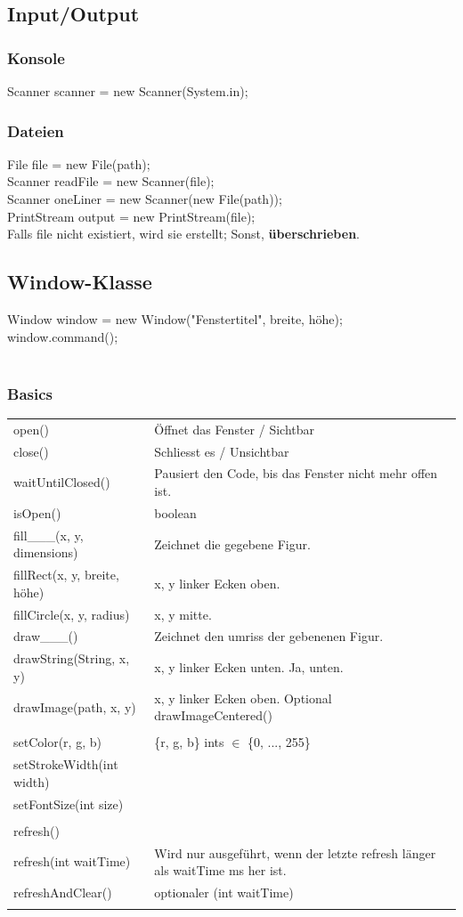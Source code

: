\documentclass[12pt,a4paper]{article}
\begin{document}
\subsection{Input/Output}
\subsubsection{Konsole}
Scanner scanner = new Scanner(System.in);
\subsubsection{Dateien}
File file = new File(path);\\
Scanner readFile = new Scanner(file);\\
Scanner oneLiner = new Scanner(new File(path));\\
PrintStream output = new PrintStream(file);\\
\hspace*{1cm} Falls file nicht existiert, wird sie erstellt; Sonst, \textbf{überschrieben}.
\newpage
\subsection{Window-Klasse}
Window window = new Window("Fenstertitel", breite, höhe);\\
window.command();\\\\
\subsubsection*{Basics}
\begin{tabularx}{\linewidth}{l X}
open() & Öffnet das Fenster / Sichtbar\\
close() & Schliesst es / Unsichtbar\\
waitUntilClosed() & Pausiert den Code, bis das Fenster nicht mehr offen ist.\\
isOpen() & boolean\\
fill\_\_\_(x, y, dimensions) & Zeichnet die gegebene Figur.\\
fillRect(x, y, breite, höhe) & x, y linker Ecken oben.\\
fillCircle(x, y, radius) & x, y mitte.\\
draw\_\_\_() & Zeichnet den umriss der gebenenen Figur.\\
drawString(String, x, y) & x, y linker Ecken unten. Ja, unten.\\
drawImage(path, x, y) & x, y linker Ecken oben. Optional drawImageCentered()\\\\
setColor(r, g, b) & \{r, g, b\} ints $\in$ \{0, ..., 255\}\\
setStrokeWidth(int width)\\
setFontSize(int size)\\\\
refresh()\\
refresh(int waitTime) & Wird nur ausgeführt, wenn der letzte refresh länger als waitTime ms her ist.\\
refreshAndClear() & optionaler (int waitTime)\\\\
\end{tabularx}
\end{document}
